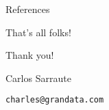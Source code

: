 \documentclass[usenames,dvipsnames]{beamer}
\begin{document}
\begin{frame}{References}
\justifying%

{}

\end{frame}

\begin{frame}{That's all folks!}
\centering
\begin{huge}
Thank you!
\end{huge}

\bigskip
\bigskip
\begin{Large}

Carlos Sarraute

\bigskip

\texttt{charles@grandata.com}
\end{Large}

\end{frame}
\end{document}

